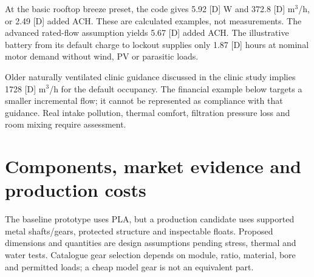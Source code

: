 \documentclass[11pt,a4paper]{article}
\begin{document}
At the basic rooftop breeze preset, the code gives \num{5.92} [D] W and \num{372.8} [D] m$^3$/h, or \num{2.49} [D] added ACH. These are calculated examples, not measurements. The advanced rated-flow assumption yields \num{5.67} [D] added ACH. The illustrative battery from its default charge to lockout supplies only \num{1.87} [D] hours at nominal motor demand without wind, PV or parasitic loads.

Older naturally ventilated clinic guidance discussed in the clinic study implies \num{1728} [D] m$^3$/h for the default occupancy. The financial example below targets a smaller incremental flow; it cannot be represented as compliance with that guidance. Real intake pollution, thermal comfort, filtration pressure loss and room mixing require assessment. \cite{clinic,whoweb}

\clearpage\section{Components, market evidence and production costs}
The baseline prototype uses PLA, but a production candidate uses supported metal shafts/gears, protected structure and inspectable floats. Proposed dimensions and quantities are design assumptions pending stress, thermal and water tests. Catalogue gear selection depends on module, ratio, material, bore and permitted loads; a cheap model gear is not an equivalent part. \cite{project,khk,windguide}
\end{document}
